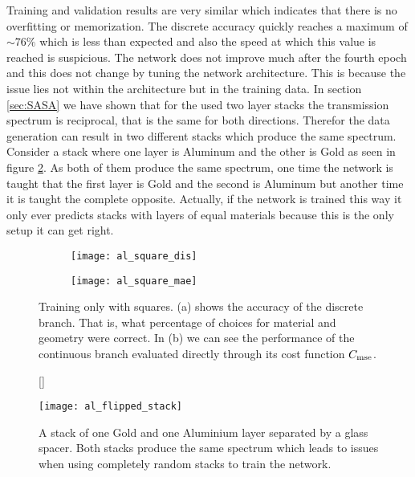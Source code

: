\indent
Training and validation results are very similar which indicates that there is no overfitting or memorization. The discrete accuracy quickly reaches a maximum of $\sim 76\%$ which is less than expected and also the speed at which this value is reached is suspicious. The network does not improve much after the fourth epoch and this does not change by tuning the network architecture. This is because the issue lies not within the architecture but in the training data. In section \ref{sec:SASA} we have shown that for the used two layer stacks the transmission spectrum is reciprocal, that is the same for both directions. Therefor the data generation can result in two different stacks which produce the same spectrum. Consider a stack where one layer is Aluminum and the other is Gold as seen in figure \ref{fig:al:same_spec}. As both of them produce the same spectrum, one time the network is taught that the first layer is Gold and the second is Aluminum but another time it is taught the complete opposite. Actually, if the network is trained this way it only ever predicts stacks with layers of equal materials because this is the only setup it can get right.

\begin{figure}[H]
    \centering
    \captionsetup[subfigure]{position=b}
    \begin{subfigure}{.5\textwidth}
        \centering
        \texttt{[image: al\_square\_dis]}
        \caption{}
    \end{subfigure}%
    \begin{subfigure}{.5\textwidth}
        \centering
        \texttt{[image: al\_square\_mae]}
        \caption{}
    \end{subfigure}
    
    \caption{Training only with squares. (a) shows the accuracy of the discrete branch. That is, what percentage of choices for material and geometry were correct. In (b) we can see the performance of the continuous branch evaluated directly through its cost function $C_{\mathrm{mse}}$.}
    \label{fig:al:square_results}
    \end{figure}

\begin{figure}[H]
    [\FBwidth]
    {\caption{A stack of one Gold and one Aluminium layer separated by a glass spacer. Both stacks produce the same spectrum which leads to issues when using completely random stacks to train the network.}
    \label{fig:al:same_spec}}
    {\texttt{[image: al\_flipped\_stack]}}
\end{figure}


